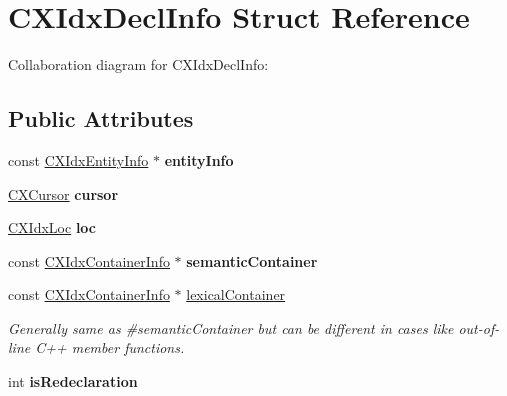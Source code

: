 \hypertarget{structCXIdxDeclInfo}{}\section{C\+X\+Idx\+Decl\+Info Struct Reference}
\label{structCXIdxDeclInfo}


Collaboration diagram for C\+X\+Idx\+Decl\+Info\+:
\subsection*{Public Attributes}
\begin{DoxyCompactItemize}
\item 
\mbox{\label{structCXIdxDeclInfo_a9baf19d381db4ef1b781dde00c71f491}} 
const \hyperlink{structCXIdxEntityInfo}{C\+X\+Idx\+Entity\+Info} $\ast$ {\bfseries entity\+Info}
\item 
\mbox{\label{structCXIdxDeclInfo_ada4e8160cc0c3e9f720e7bd212a739a2}} 
\hyperlink{structCXCursor}{C\+X\+Cursor} {\bfseries cursor}
\item 
\mbox{\label{structCXIdxDeclInfo_a89fec7990b7c494334c3ec0f1923a5fe}} 
\hyperlink{structCXIdxLoc}{C\+X\+Idx\+Loc} {\bfseries loc}
\item 
\mbox{\label{structCXIdxDeclInfo_a5187651353934832d8616a5d7adb9aa5}} 
const \hyperlink{structCXIdxContainerInfo}{C\+X\+Idx\+Container\+Info} $\ast$ {\bfseries semantic\+Container}
\item 
\mbox{\label{structCXIdxDeclInfo_aef123dde6713b5fe4af3b1715c9636ca}} 
const \hyperlink{structCXIdxContainerInfo}{C\+X\+Idx\+Container\+Info} $\ast$ \hyperlink{structCXIdxDeclInfo_aef123dde6713b5fe4af3b1715c9636ca}{lexical\+Container}
\begin{DoxyCompactList}\small\item\em Generally same as \#semantic\+Container but can be different in cases like out-\/of-\/line C++ member functions. \end{DoxyCompactList}\item 
\mbox{\label{structCXIdxDeclInfo_a7958178e9e6dfa3f88ff87132e827636}} 
int {\bfseries is\+Redeclaration}

\end{DoxyCompactItemize}
